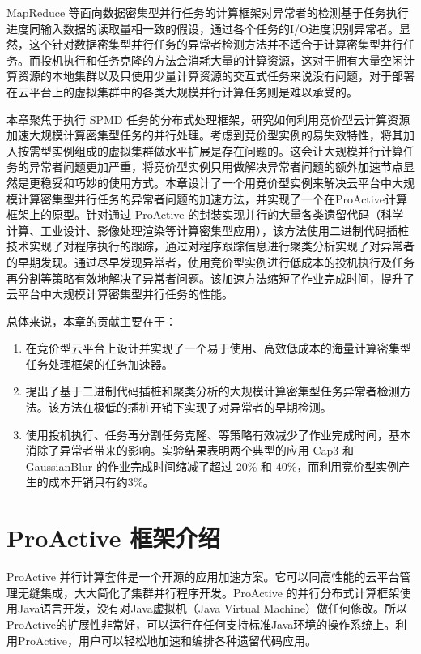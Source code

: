 MapReduce 等面向数据密集型并行任务的计算框架对异常者的检测基于任务执行进度同输入数据的读取量相一致的假设，通过各个任务的I/O进度识别异常者。显然，这个针对数据密集型并行任务的异常者检测方法并不适合于计算密集型并行任务。而投机执行和任务克隆的方法会消耗大量的计算资源，这对于拥有大量空闲计算资源的本地集群以及只使用少量计算资源的交互式任务来说没有问题，对于部署在云平台上的虚拟集群中的各类大规模并行计算任务则是难以承受的。

本章聚焦于执行 SPMD 任务的分布式处理框架，研究如何利用竞价型云计算资源加速大规模计算密集型任务的并行处理。考虑到竞价型实例的易失效特性，将其加入按需型实例组成的虚拟集群做水平扩展是存在问题的。这会让大规模并行计算任务的异常者问题更加严重，将竞价型实例只用做解决异常者问题的额外加速节点显然是更稳妥和巧妙的使用方式。本章设计了一个用竞价型实例来解决云平台中大规模计算密集型并行任务的异常者问题的加速方法，并实现了一个在ProActive计算框架上的原型。针对通过 ProActive 的封装实现并行的大量各类遗留代码（科学计算、工业设计、影像处理渲染等计算密集型应用），该方法使用二进制代码插桩技术实现了对程序执行的跟踪，通过对程序跟踪信息进行聚类分析实现了对异常者的早期发现。通过尽早发现异常者，使用竞价型实例进行低成本的投机执行及任务再分割等策略有效地解决了异常者问题。该加速方法缩短了作业完成时间，提升了云平台中大规模计算密集型并行任务的性能。

总体来说，本章的贡献主要在于：
\begin{enumerate}
\item 在竞价型云平台上设计并实现了一个易于使用、高效低成本的海量计算密集型任务处理框架的任务加速器。
\item 提出了基于二进制代码插桩和聚类分析的大规模计算密集型任务异常者检测方法。该方法在极低的插桩开销下实现了对异常者的早期检测。
\item 使用投机执行、任务再分割任务克隆、等策略有效减少了作业完成时间，基本消除了异常者带来的影响。实验结果表明两个典型的应用 Cap3 和 GaussianBlur 的作业完成时间缩减了超过 20\% 和 40\%，而利用竞价型实例产生的成本开销只有约3\%。
\end{enumerate}

\section{ProActive 框架介绍}
ProActive \cite{ProActive} 并行计算套件是一个开源的应用加速方案。它可以同高性能的云平台管理无缝集成，大大简化了集群并行程序开发。ProActive 的并行分布式计算框架使用Java语言开发，没有对Java虚拟机（Java Virtual Machine）做任何修改。所以 ProActive的扩展性非常好，可以运行在任何支持标准Java环境的操作系统上。利用ProActive，用户可以轻松地加速和编排各种遗留代码应用。

